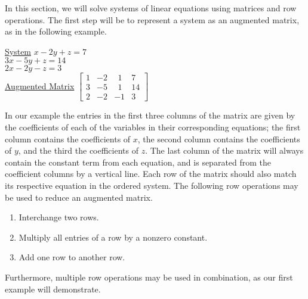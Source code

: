 {}\pp
In this section, we will solve systems of linear equations using matrices and row operations.  The first step will be to represent a system as an augmented matrix, as in the following example.
\begin{example}
\end{example}
\begin{center}
\begin{multicols}{2}
\underline{System}\pp
$x-2y+z=7$\\
$3x-5y+z=14$\\
$2x-2y-z=3$\\
\underline{Augmented Matrix}\pp
$\left[\begin{array}{ccc|c}
1 & -2 & ~~1 & 7\\
3 & -5 & ~~1 & 14\\
2 & -2 & -1 & 3~
\end{array}\right]$
\end{multicols}
\end{center}

In our example the entries in the first three columns of the matrix are given by the coefficients of each of the variables in their corresponding equations; the first column contains the coefficients of $x$, the second column contains the coefficients of $y$, and the third the coefficients of $z$.  The last column of the matrix will always contain the constant term from each equation, and is separated from the coefficient columns by a vertical line.  Each row of the matrix should also match its respective equation in the ordered system.
\pp
The following row operations may be used to reduce an augmented matrix.
\begin{enumerate}
	\item Interchange two rows.
	\item Multiply all entries of a row by a nonzero constant.
	\item Add one row to another row.
\end{enumerate}
Furthermore, multiple row operations may be used in combination, as our first example will demonstrate.\pp

